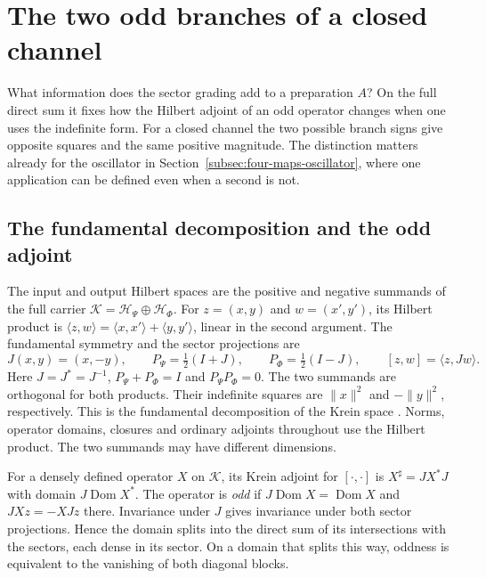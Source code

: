 \documentclass[11pt]{article}
\theoremstyle{definition}
\begin{document}
\appendix

\section{The two odd branches of a closed channel}
\label{app:channel-branches}

What information does the sector grading add to a preparation $A$? On the full direct sum it fixes how the Hilbert adjoint of an odd operator changes when one uses the indefinite form. For a closed channel the two possible branch signs give opposite squares and the same positive magnitude. The distinction matters already for the oscillator in Section~\ref{subsec:four-maps-oscillator}, where one application can be defined even when a second is not.

\subsection{The fundamental decomposition and the odd adjoint}

The input and output Hilbert spaces are the positive and negative summands of the full carrier $\mathcal K=\mathcal H_\Psi\oplus\mathcal H_\Phi$. For $z=(x,y)$ and $w=(x',y')$, its Hilbert product is $\langle z,w\rangle=\langle x,x'\rangle+\langle y,y'\rangle$, linear in the second argument. The fundamental symmetry and the sector projections are
\begin{equation}
 J(x,y)=(x,-y),\qquad P_\Psi=\tfrac12(I+J),\qquad P_\Phi=\tfrac12(I-J),
 \qquad [z,w]=\langle z,Jw\rangle .
 \label{eq:carrier-grading}
\end{equation}
Here $J=J^*=J^{-1}$, $P_\Psi+P_\Phi=I$ and $P_\Psi P_\Phi=0$. The two summands are orthogonal for both products. Their indefinite squares are $\|x\|^2$ and $-\|y\|^2$, respectively. This is the fundamental decomposition of the Krein space \cite{Bognar1974}. Norms, operator domains, closures and ordinary adjoints throughout use the Hilbert product. The two summands may have different dimensions.

For a densely defined operator $X$ on $\mathcal K$, its Krein adjoint for $[\cdot,\cdot]$ is $X^\sharp=JX^*J$ with domain $J\operatorname{Dom}X^*$. The operator is \emph{odd} if $J\operatorname{Dom}X=\operatorname{Dom}X$ and $JXz=-XJz$ there. Invariance under $J$ gives invariance under both sector projections. Hence the domain splits into the direct sum of its intersections with the sectors, each dense in its sector. On a domain that splits this way, oddness is equivalent to the vanishing of both diagonal blocks.
\end{document}
